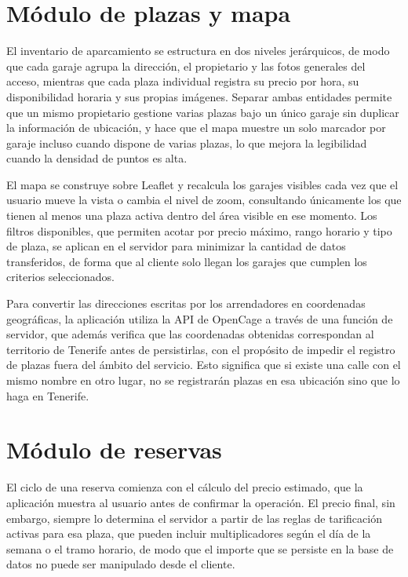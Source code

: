 \section{Módulo de plazas y mapa}
\label{sec:impl_parking}

El inventario de aparcamiento se estructura en dos niveles jerárquicos, de modo que cada garaje agrupa la dirección, el propietario y las fotos generales del acceso, mientras que cada plaza individual registra su precio por hora, su disponibilidad horaria y sus propias imágenes. Separar ambas entidades permite que un mismo propietario gestione varias plazas bajo un único garaje sin duplicar la información de ubicación, y hace que el mapa muestre un solo marcador por garaje incluso cuando dispone de varias plazas, lo que mejora la legibilidad cuando la densidad de puntos es alta.

El mapa se construye sobre Leaflet y recalcula los garajes visibles cada vez que el usuario mueve la vista o cambia el nivel de zoom, consultando únicamente los que tienen al menos una plaza activa dentro del área visible en ese momento. Los filtros disponibles, que permiten acotar por precio máximo, rango horario y tipo de plaza, se aplican en el servidor para minimizar la cantidad de datos transferidos, de forma que al cliente solo llegan los garajes que cumplen los criterios seleccionados.

Para convertir las direcciones escritas por los arrendadores en coordenadas geográficas, la aplicación utiliza la API de OpenCage a través de una función de servidor, que además verifica que las coordenadas obtenidas correspondan al territorio de Tenerife antes de persistirlas, con el propósito de impedir el registro de plazas fuera del ámbito del servicio. Esto significa que si existe una calle con el mismo nombre en otro lugar, no se registrarán plazas en esa ubicación sino que lo haga en Tenerife.

\section{Módulo de reservas}
\label{sec:impl_reservas}

El ciclo de una reserva comienza con el cálculo del precio estimado, que la aplicación muestra al usuario antes de confirmar la operación. El precio final, sin embargo, siempre lo determina el servidor a partir de las reglas de tarificación activas para esa plaza, que pueden incluir multiplicadores según el día de la semana o el tramo horario, de modo que el importe que se persiste en la base de datos no puede ser manipulado desde el cliente.

